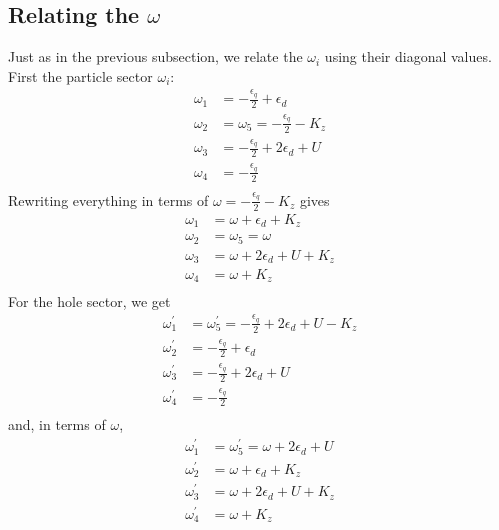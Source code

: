 \documentclass[12pt,twoside]{article}
\numberwithin{equation}{section}
\begin{document}
\subsection{Relating the \(\omega\)}
Just as in the previous subsection, we relate the \(\omega_i\) using their diagonal values.
\pb First the particle sector \(\omega_i\):
\begin{equation}\begin{aligned}
	\omega_1 &= -\frac{\epsilon_q}{2} + \epsilon_d\\
	\omega_2 &= \omega_5 = -\frac{\epsilon_q}{2} - K_z\\
	\omega_3 &= -\frac{\epsilon_q}{2} + 2\epsilon_d + U\\
	\omega_4 &= -\frac{\epsilon_q}{2}\\
\end{aligned}\end{equation}
Rewriting everything in terms of \(\omega = -\frac{\epsilon_q}{2} - K_z\) gives
\begin{equation}\begin{aligned}
	\omega_1 &= \omega + \epsilon_d + K_z\\
	\omega_2 &= \omega_5 = \omega\\
	\omega_3 &= \omega + 2\epsilon_d + U + K_z\\
	\omega_4 &= \omega + K_z\\
\end{aligned}\end{equation}
For the hole sector, we get
\begin{equation}\begin{aligned}
	\omega^\prime_1 &= \omega_5^\prime = -\frac{\epsilon_q}{2} + 2\epsilon_d + U - K_z\\
	\omega^\prime_2 &= -\frac{\epsilon_q}{2} + \epsilon_d\\
	\omega_3^\prime &= -\frac{\epsilon_q}{2} + 2\epsilon_d + U\\
	\omega^\prime_4 &= -\frac{\epsilon_q}{2}\\
\end{aligned}\end{equation}
and, in terms of \(\omega\),
\begin{equation}\begin{aligned}
	\omega^\prime_1 &= \omega_5^\prime = \omega + 2\epsilon_d + U\\
	\omega^\prime_2 &= \omega + \epsilon_d + K_z\\
	\omega_3^\prime &= \omega + 2\epsilon_d + U + K_z\\
	\omega^\prime_4 &= \omega + K_z\\
\end{aligned}\end{equation}
\end{document}
